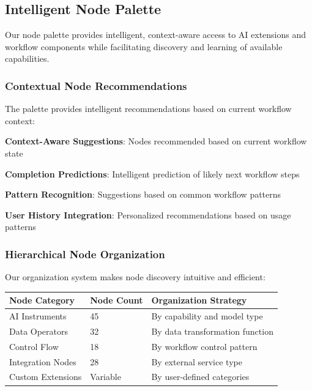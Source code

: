 \subsection*{Intelligent Node Palette}

Our node palette provides intelligent, context-aware access to AI extensions and workflow components while facilitating discovery and learning of available capabilities.

\subsubsection*{Contextual Node Recommendations}

The palette provides intelligent recommendations based on current workflow context:

\begin{expandedlist}
    \item \textbf{Context-Aware Suggestions}: Nodes recommended based on current workflow state
    \item \textbf{Completion Predictions}: Intelligent prediction of likely next workflow steps
    \item \textbf{Pattern Recognition}: Suggestions based on common workflow patterns
    \item \textbf{User History Integration}: Personalized recommendations based on usage patterns
\end{expandedlist}

\subsubsection*{Hierarchical Node Organization}

Our organization system makes node discovery intuitive and efficient:

\begin{center}
\begin{tabular}{@{}lll@{}}
\toprule
\textbf{Node Category} & \textbf{Node Count} & \textbf{Organization Strategy} \\
\midrule
AI Instruments & 45 & By capability and model type \\
Data Operators & 32 & By data transformation function \\
Control Flow & 18 & By workflow control pattern \\
Integration Nodes & 28 & By external service type \\
Custom Extensions & Variable & By user-defined categories \\
\bottomrule
\end{tabular}
\end{center}

